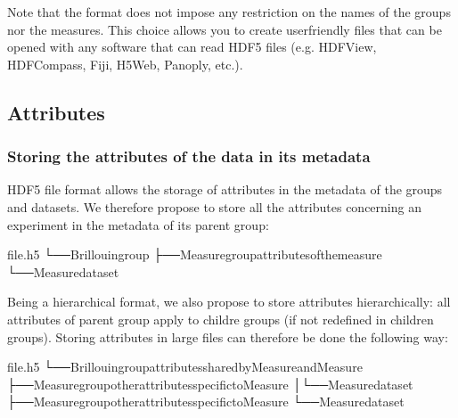 \documentclass[letterpaper,10pt,english]{sphinxmanual}
\begin{document}
\sphinxAtStartPar
Note that the format does not impose any restriction on the names of the groups nor the measures. This choice allows you to create user\sphinxhyphen{}friendly files that can be opened with any software that can read HDF5 files (e.g. HDFView, HDFCompass, Fiji, H5Web, Panoply, etc.).


\subsection{Attributes}
\label{\detokenize{source/file_format:attributes}}

\subsubsection{Storing the attributes of the data in its metadata}
\label{\detokenize{source/file_format:storing-the-attributes-of-the-data-in-its-metadata}}
\sphinxAtStartPar
HDF5 file format allows the storage of attributes in the metadata of the groups and datasets. We therefore propose to store all the attributes concerning an experiment in the metadata of its parent group:

\begin{sphinxVerbatim}[commandchars=\\\{\}]
file.h5
└──Brillouingroup
├──Measuregroup\PYGZhy{}\PYGZgt{}attributesofthemeasure
└──Measuredataset
\end{sphinxVerbatim}

\sphinxAtStartPar
Being a hierarchical format, we also propose to store attributes hierarchically: all attributes of parent group apply to childre groups (if not redefined in children groups). Storing attributes in large files can therefore be done the following way:

\begin{sphinxVerbatim}[commandchars=\\\{\}]
file.h5
└──Brillouingroup\PYGZhy{}\PYGZgt{}attributessharedbyMeasureandMeasure
├──Measuregroup\PYGZhy{}\PYGZgt{}otherattributesspecifictoMeasure
│└──Measuredataset
├──Measuregroup\PYGZhy{}\PYGZgt{}otherattributesspecifictoMeasure
└──Measuredataset
\end{sphinxVerbatim}
\end{document}
